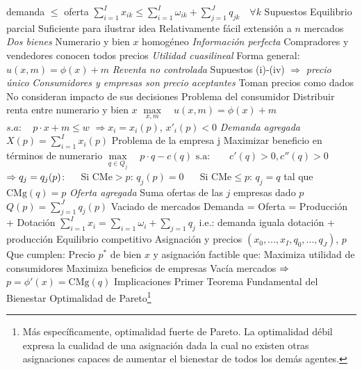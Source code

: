 \documentclass{nuevotema}
\begin{document}
\begin{esquemal}
				\4[] demanda $\leq$ oferta
				\4[] $ \sum_{i=1}^{I} x_{ik} \leq \sum_{i=1}^{I} \omega_{ik} + \sum_{j=1}^{J} q_{jk} \quad \forall k$
			\3 Supuestos
				\4 Equilibrio parcial
				\4[$\to$] Suficiente para ilustrar idea
				\4[$\to$] Relativamente fácil extensión a $n$ mercados
				\4[(i)] \textit{Dos bienes}
				\4[] Numerario y bien $x$ homogéneo
				\4[(ii)] \textit{Información perfecta}
				\4[] Compradores y vendedores conocen todos precios
				\4[(iii)] \textit{Utilidad cuasilineal}
				\4[] Forma general: $u(x,m) = \phi(x) + m$
				\4[(iv)] \textit{Reventa no controlada}
				\4[$\to$] Supuestos (i)-(iv) $\Rightarrow$ \textit{precio único}
				\4[(v)] \textit{Consumidores y empresas son precio aceptantes}
				\4[] Toman precios como dados
				\4[] No consideran impacto de sus decisiones
			\3 Problema del consumidor
				\4 Distribuir renta entre numerario y bien $x$
				\4[] $\underset{x,m}{\max} \quad u(x,m) = \phi(x) + m$
				\4[] $s.a: \quad p\cdot x + m \leq w$
				\4[] 
				\4[] $\Rightarrow x_i=x_i(p)$, $x'_i(p) < 0$
				\4 \textit{Demanda agregada}
				\4[] $X(p) = \sum_{i=1}^I x_i(p)$
				\4[] 
			\3 Problema de la empresa j
				\4 Maximizar beneficio en términos de numerario
				\4[] $\underset{q \in Q_j}{\max} \quad p \cdot q - c(q)$
				\4[] $\text{s.a:} \quad \quad c'(q) > 0, c''(q) >0$
				\4[] 
				\4[] $\Rightarrow q_j = q_j(p)$:
				\4[] $\quad$ Si $\text{CMe}>p$: $q_j(p)=0$
				\4[] $\quad$ Si $\text{CMe} \leq p$: $q_j=q$ tal que $\text{CMg}(q) = p$
				\4[] 
				\4 \textit{Oferta agregada}
				\4[] Suma ofertas de las $j$ empresas dado $p$
				\4[] $Q(p) = \sum_{j=1}^J q_j(p)$
				\4[] 
			\3 Vaciado de mercados
				\4 Demanda = Oferta = Producción + Dotación
				\4[] $ \sum_{i=1}^I x_i = \sum_{i=1} \omega_i + \sum_{j=1} q_j $
				\4[] i.e.: demanda iguala dotación + producción
				\4[] 
			\3 {Equilibrio competitivo}
				\4 Asignación y precios
				\4[] $(x_0, ..., x_I, q_0, ..., q_J)$, $p$
				\4 Que cumplen:
				\4 Precio $p^*$ de bien $x$ y asignación factible que:
				\4[(i)] Maximiza utilidad de consumidores
				\4[] 
				\4[(ii)] Maximiza beneficios de empresas
				\4[] 
				\4[(iii)] Vacía mercados
				\4[] $\Rightarrow$ $p=\phi'(x) = \text{CMg}(q)$
		\2 Implicaciones
			\3 Primer Teorema Fundamental del Bienestar
				\4 Optimalidad de Pareto\footnote{Más específicamente, optimalidad fuerte de Pareto. La optimalidad débil expresa la cualidad de una asignación dada la cual no existen otras asignaciones capaces de aumentar el bienestar de todos los demás agentes.}

\end{esquemal}
\end{document}

